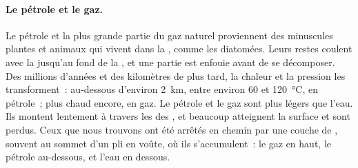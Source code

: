 \paragraph{Le pétrole et le gaz.} Le pétrole et la plus grande partie du gaz
naturel proviennent des minuscules plantes et animaux qui vivent dans la
, comme les diatomées. Leurs restes coulent avec la  jusqu'au fond
de la , et une partie est enfouie avant de se décomposer. Des millions
d'années et des kilomètres de  plus tard, la chaleur et la
pression les transforment~: au-dessous d'environ \qty{2}{km}, entre
environ 60 et \qty{120}{\degreeCelsius}, en pétrole~; plus chaud encore, en
gaz. Le pétrole et le gaz sont plus légers que l'eau. Ils montent
lentement à travers les  des  , et beaucoup atteignent
la surface et sont perdus. Ceux que nous trouvons ont été arrêtés en
chemin par une couche de  , souvent au sommet d'un pli en
voûte, où ils s'accumulent~: le gaz en haut, le pétrole au-dessous, et
l'eau en dessous.


